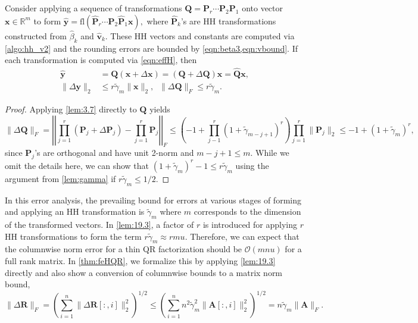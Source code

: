 \documentclass[review,onefignum,onetabnum]{siamart190516}
\newcommand{\R}{\mathbb{R}}
\newcommand{\bb}[1]{\mathbf{#1}}
\newcommand{\fl}{\mathrm{fl}}
\newcommand{\cO}{\mathcal{O}}
\begin{document}
\begin{lemma}\label{lem:19.3}
	Consider applying a sequence of transformations $\bb{Q}=\bb{P}_{r}\cdots\bb{P}_{2}\bb{P}_1$ onto vector $\bb{x}\in\R^m$ to form $\hat{\bb{y}} =\fl(\hat{\bb{P}}_{r}\cdots\hat{\bb{P}}_{2}\hat{\bb{P}}_{1}\bb{x}),$
	where $\hat{\bb{P}}_{k}$'s are HH transformations constructed from $\hat{\beta}_k$ and $\hat{\bb{v}}_{k}$.
	These HH vectors and constants are computed via \cref{algo:hh_v2} and the rounding errors are bounded by \cref{eqn:beta3,eqn:vbound}.
	If each transformation is computed via \cref{eqn:effH}, then
	\begin{align}
	\hat{\bb{y}} &= \bb{Q} (\bb{x} +\Delta \bb{x}) = (\bb{Q} + \Delta \bb{Q})\bb{x} = \hat{\bb{Q}}\bb{x},\\
	\|\Delta \bb{y}\|_2 &\leq r\tilde{\gamma}_m\|\bb{x}\|_2,\;\; \|\Delta \bb{Q}\|_F\leq r\tilde{\gamma}_m .\label{eqn:19.3}
	\end{align}
\end{lemma}
\begin{proof}
	Applying \cref{lem:3.7} directly to $\bb{Q}$ yields
	\[
		\|\Delta\bb{Q}\|_F = \left|\left|\prod_{j=1}^r (\bb{P}_{j} + \Delta \bb{P}_{j})- \prod_{j=1}^r\bb{P}_{j} \right|\right|_F\leq\left(-1+\prod_{j-1}^r(1+\tilde{\gamma}_{m-j+1})^r\right)\prod_{j=1}^r\|\bb{P}_{j}\|_2 \leq -1+(1+\tilde{\gamma}_m)^r,\]
	since $\bb{P}_{j}$'s are orthogonal and have unit 2-norm and $m-j+1 \leq m$.
	While we omit the details here, we can show that $(1+\tilde{\gamma}_m)^r-1 \leq r\tilde{\gamma}_m$ using the argument from \cref{lem:gamma} if $r\tilde{\gamma}_m \leq 1/2$.
\end{proof}
In this error analysis, the prevailing bound for errors at various stages of forming and applying an HH transformation is $\tilde{\gamma}_{m}$ where $m$ corresponds to the dimension of the transformed vectors.
In \cref{lem:19.3}, a factor of $r$ is introduced for applying $r$ HH transformations to form the term $r\tilde{\gamma}_m \approx rmu$. 
Therefore, we can expect that the columnwise norm error for a thin QR factorization should be $\cO(mnu)$ for a full rank matrix.
In \cref{thm:feHQR}, we formalize this by applying \cref{lem:19.3} directly and also show a conversion of columnwise bounds to a matrix norm bound,
\begin{equation*}
	\|\Delta \bb{R} \|_F = \left(\sum_{i=1}^n \|\Delta \bb{R}[:,i]\|_2^2\right)^{1/2} \leq \left(\sum_{i=1}^n n^2\tilde{\gamma}_{m}^2 \|\bb{A}[:,i]\|_2^2\right)^{1/2} = n\tilde{\gamma}_{m} \|\bb{A}\|_F.
\end{equation*}
\end{document}
